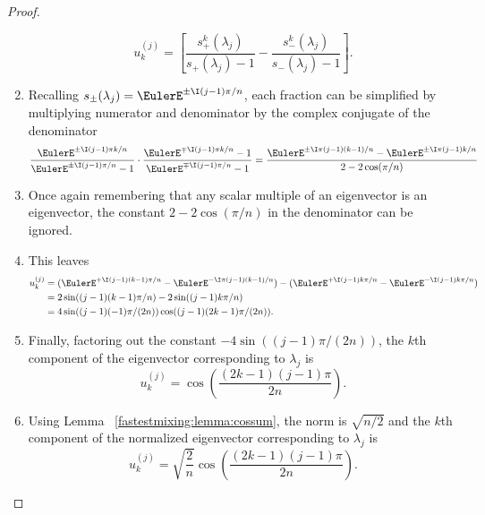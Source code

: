 \documentclass[12pt]{article}
\begin{document}
\begin{proof}
\begin{enumerate}
            \[
                u_k^{(j)} = \left[ \frac{s_+^k(\lambda_j)}{s_+(\lambda_j)
                - 1} - \frac{s_-^k(\lambda_j)}{s_-(\lambda_j) - 1}
                \right].
            \]
        \item
            Recalling \( s_{\pm}(\lambda_j) = \EulerE^{\pm \I (j-1)\pi/n}
            \), each fraction can be simplified by multiplying numerator
            and denominator by the complex conjugate of the denominator
            \[
                \frac{\EulerE^{\pm \I (j-1) \pi k/n}}{\EulerE^{\pm \I (j-1)
                \pi/n} - 1} \cdot \frac{\EulerE^{\mp \I (j-1) \pi k/n}-1}
                {\EulerE^{\mp \I (j-1) \pi/n} - 1} = \frac{\EulerE^{\pm
                \I \pi (j-1) (k-1)/n} - \EulerE^{\pm \I \pi (j-1) k/n}}{2-
                2\cos(\pi/n)}
            \]
        \item
            Once again remembering that any scalar multiple of an
            eigenvector is an eigenvector, the constant \( 2- 2\cos(\pi/n)
            \) in the denominator can be ignored.
        \item
            This leaves
            \begin{align*}
                u_k^{(j)} &= (\EulerE^{+ \I (j-1)(k-1)\pi/n} - \EulerE^{-
                \I \pi (j-1)(k-1)/n}) - (\EulerE^{+ \I (j-1) k \pi /n} -
                \EulerE^{- \I (j-1) k \pi /n}) \\
                &= 2\sin( (j-1) (k-1) \pi /n) - 2\sin( (j-1) k\pi /n) \\
                &= 4 \sin( (j-1) (-1) \pi/(2n)) \cos((j-1) (2k-1) \pi /(2n)
                ).
            \end{align*}
        \item
            Finally, factoring out the constant \( -4 \sin( (j-1)\pi/(2n))
            \), the \( k \)th component of the eigenvector corresponding
            to \( \lambda_j \) is
            \[
                u^{(j)}_k = \cos\left( \frac{(2k-1)(j-1)\pi}{2n} \right).
            \]
        \item
            Using Lemma~%
            \ref{fastestmixing:lemma:cossum}, the norm is \( \sqrt{n/2} \)
            and the \( k \)th component of the normalized eigenvector
            corresponding to \( \lambda_j \) is
            \[
                u^{(j)}_k = \sqrt{\frac{2}{n}} \cos\left( \frac{(2k-1)(j-1)\pi}
                {2n} \right).
            \]
    \end{enumerate}
\end{proof}
\end{document}
